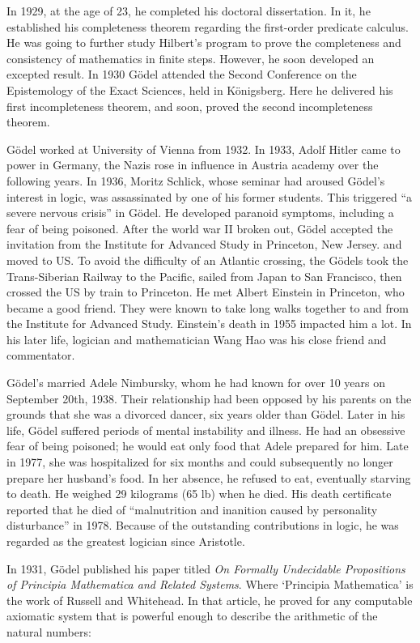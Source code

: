 \documentclass{article}
\begin{document}
In 1929, at the age of 23, he completed his doctoral dissertation. In it, he established his completeness theorem regarding the first-order predicate calculus. He was going to further study Hilbert's program to prove the completeness and consistency of mathematics in finite steps. However, he soon developed an excepted result. In 1930 Gödel attended the Second Conference on the Epistemology of the Exact Sciences, held in Königsberg. Here he delivered his first incompleteness theorem, and soon, proved the second incompleteness theorem.

Gödel worked at University of Vienna from 1932. In 1933, Adolf Hitler came to power in Germany, the Nazis rose in influence in Austria academy over the following years. In 1936, Moritz Schlick, whose seminar had aroused Gödel's interest in logic, was assassinated by one of his former students. This triggered ``a severe nervous crisis'' in Gödel. He developed paranoid symptoms, including a fear of being poisoned. After the world war II broken out, Gödel accepted the invitation from the Institute for Advanced Study in Princeton, New Jersey. and moved to US. To avoid the difficulty of an Atlantic crossing, the Gödels took the Trans-Siberian Railway to the Pacific, sailed from Japan to San Francisco, then crossed the US by train to Princeton. He met Albert Einstein in Princeton, who became a good friend. They were known to take long walks together to and from the Institute for Advanced Study. Einstein's death in 1955 impacted him a lot. In his later life, logician and mathematician Wang Hao was his close friend and commentator.

Gödel's married Adele Nimbursky, whom he had known for over 10 years on September 20th, 1938. Their relationship had been opposed by his parents on the grounds that she was a divorced dancer, six years older than Gödel. Later in his life, Gödel suffered periods of mental instability and illness. He had an obsessive fear of being poisoned; he would eat only food that Adele prepared for him. Late in 1977, she was hospitalized for six months and could subsequently no longer prepare her husband's food. In her absence, he refused to eat, eventually starving to death. He weighed 29 kilograms (65 lb) when he died. His death certificate reported that he died of ``malnutrition and inanition caused by personality disturbance'' in 1978. Because of the outstanding contributions in logic, he was regarded as the greatest logician since Aristotle.

In 1931, Gödel published his paper titled {\em On Formally Undecidable Propositions of Principia Mathematica and Related Systems}. Where `Principia Mathematica' is the work of Russell and Whitehead. In that article, he proved for any computable axiomatic system that is powerful enough to describe the arithmetic of the natural numbers:
\end{document}
